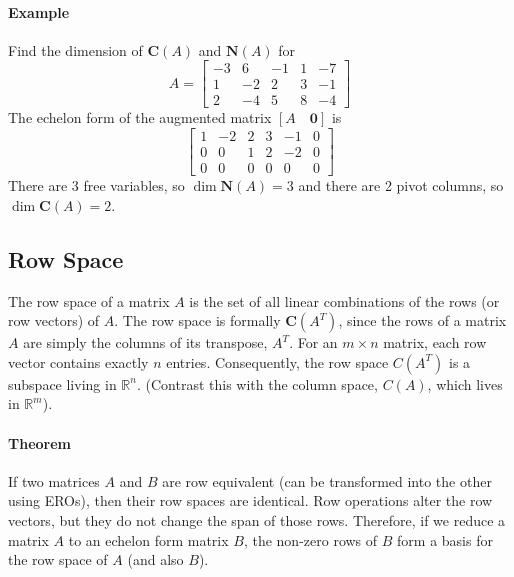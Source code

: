 \documentclass[../linear-algebra.tex]{subfiles}
\begin{document}
\paragraph{Example} Find the dimension of $\mathbf{C}(A)$ and $\mathbf{N}(A)$ for
$$A = \begin{bmatrix} -3 & 6 & -1 & 1 & -7 \\ 1 & -2 & 2 & 3 & -1 \\ 2 & -4 & 5 & 8 & -4 \end{bmatrix}$$
The echelon form of the augmented matrix $[A \quad \mathbf{0}]$ is
$$\begin{bmatrix} 1 & -2 & 2 & 3 & -1 & 0 \\ 0 & 0 & 1 & 2 & -2 & 0 \\ 0 & 0 & 0 & 0 & 0 & 0 \end{bmatrix}$$
There are 3 free variables, so $\dim \mathbf{N}(A) = 3$ and there are 2 pivot columns, so $\dim \mathbf{C}(A) = 2$.

\subsection{Row Space}
The row space of a matrix $A$ is the set of all linear combinations of the rows (or row vectors) of $A$.\newline
The row space is formally $\mathbf{C}(A^T)$, since the rows of a matrix $A$ are simply the columns of its transpose, $A^T$.\newline
For an $m \times n$ matrix, each row vector contains exactly $n$ entries. Consequently, the row space $C(A^T)$ is a subspace living in $\mathbb{R}^n$. (Contrast this with the column space, $C(A)$, which lives in $\mathbb{R}^m$).
\paragraph{Theorem} If two matrices $A$ and $B$ are row equivalent (can be transformed into the other using EROs), then their row spaces are identical.\newline
Row operations alter the row vectors, but they do not change the span of those rows. Therefore, if we reduce a matrix $A$ to an echelon form matrix $B$, the non-zero rows of $B$ form a basis for the row space of $A$ (and also $B$).
\end{document}
